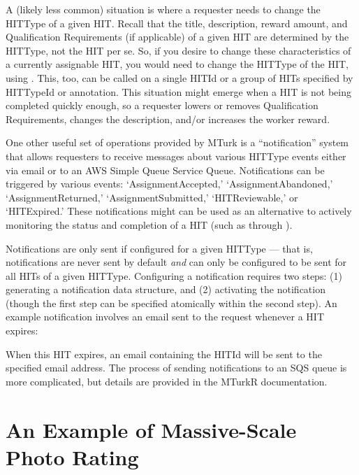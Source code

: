 A (likely less common) situation is where a requester needs to change the HITType of a given HIT. Recall that the title, description, reward amount, and Qualification Requirements (if applicable) of a given HIT are determined by the HITType, not the HIT per se. So, if you desire to change these characteristics of a currently assignable HIT, you would need to change the HITType of the HIT, using . This, too, can be called on a single HITId or a group of HITs specified by HITTypeId or annotation. This situation might emerge when a HIT is not being completed quickly enough, so a requester lowers or removes Qualification Requirements, changes the description, and/or increases the worker reward.

One other useful set of operations provided by MTurk is a ``notification'' system that allows requesters to receive messages about various HITType events either via email or to an AWS Simple Queue Service Queue. Notifications can be triggered by various events: `AssignmentAccepted,' `AssignmentAbandoned,' `AssignmentReturned,' `AssignmentSubmitted,' `HITReviewable,' or `HITExpired.' These notifications might can be used as an alternative to actively monitoring the status and completion of a HIT (such as through ). 

Notifications are only sent if configured for a given HITType --- that is, notifications are never sent by default \emph{and} can only be configured to be sent for all HITs of a given HITType. Configuring a notification requires two steps: (1) generating a notification data structure, and (2) activating the notification (though the first step can be specified atomically within the second step). An example notification involves an email sent to the request whenever a HIT expires:


\noindent When this HIT expires, an email containing the HITId will be sent to the specified email address. The process of sending notifications to an SQS queue is more complicated, but details are provided in the MTurkR documentation.

\section{An Example of Massive-Scale Photo Rating}

